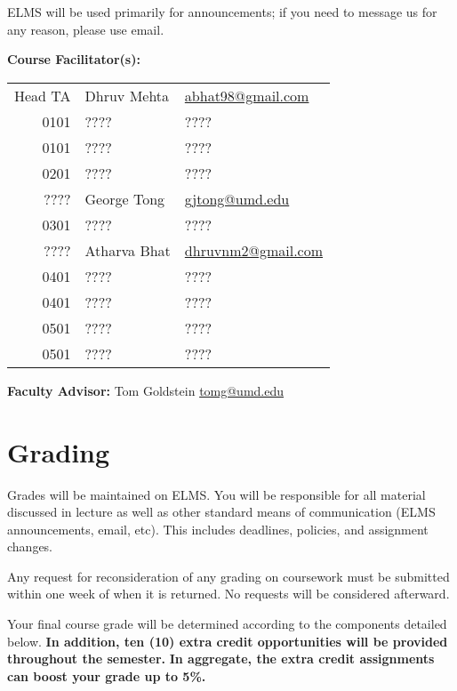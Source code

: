 \documentclass[12pt]{article}
\begin{document}
ELMS will be used primarily for announcements; if you need to message us for any reason,
please use email.

\medskip

\noindent\textbf{Course Facilitator(s): }

\begin{table}[H]
  \begin{tabular}{@{}rll}
    Head TA & Dhruv Mehta     & \href{mailto:abhat98@gmail.com}{abhat98@gmail.com}\\
    0101    & ????       & ????\\
    0101    & ????       & ????\\
    0201    & ????       & ????\\
    ????    & George Tong     & \href{mailto:gjtong@umd.edu}{gjtong@umd.edu}\\
    0301    & ????       & ????\\
    ????    & Atharva Bhat    & \href{mailto:dhruvnm2@gmail.com}{dhruvnm2@gmail.com}\\
    0401    & ????       & ????\\
    0401    & ????       & ????\\
    0501    & ????       & ????\\
    0501    & ????       & ????\\
  \end{tabular}
\end{table}
\medskip

\noindent\textbf{Faculty Advisor: }Tom Goldstein
\href{mailto:tomg@umd.edu}{tomg@umd.edu} \medskip

\bigskip
\section*{Grading}
\noindent Grades will be maintained on ELMS.
You will be responsible for all material discussed in lecture as well as other standard means of communication (ELMS announcements, email, etc).
This includes deadlines, policies, and assignment changes.

Any request for reconsideration of any grading on coursework must be submitted within one week of when it is returned.
No requests will be considered afterward.

Your final course grade will be determined according to the components detailed below.
\textbf{In addition, ten (10) extra credit opportunities will be provided throughout the semester.}
\textbf{In aggregate, the extra credit assignments can boost your grade up to 5\%.} \medskip
\end{document}
